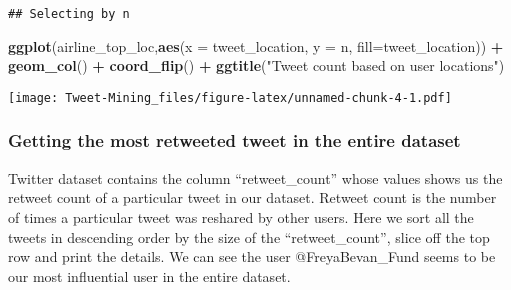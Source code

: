 \documentclass[
]{article}
\newenvironment{Shaded}{\begin{snugshade}}{\end{snugshade}}
\newcommand{\CommentTok}[1]{\textcolor[rgb]{0.56,0.35,0.01}{\textit{#1}}}
\newcommand{\DataTypeTok}[1]{\textcolor[rgb]{0.13,0.29,0.53}{#1}}
\newcommand{\DecValTok}[1]{\textcolor[rgb]{0.00,0.00,0.81}{#1}}
\newcommand{\KeywordTok}[1]{\textcolor[rgb]{0.13,0.29,0.53}{\textbf{#1}}}
\newcommand{\NormalTok}[1]{#1}
\newcommand{\OperatorTok}[1]{\textcolor[rgb]{0.81,0.36,0.00}{\textbf{#1}}}
\newcommand{\StringTok}[1]{\textcolor[rgb]{0.31,0.60,0.02}{#1}}
\begin{document}
\begin{verbatim}
## Selecting by n
\end{verbatim}

\begin{Shaded}
\begin{Highlighting}[]
\KeywordTok{ggplot}\NormalTok{(airline_top_loc,}\KeywordTok{aes}\NormalTok{(}\DataTypeTok{x =}\NormalTok{ tweet_location, }\DataTypeTok{y =}\NormalTok{ n, }\DataTypeTok{fill=}\NormalTok{tweet_location)) }\OperatorTok{+}\StringTok{ }\KeywordTok{geom_col}\NormalTok{() }\OperatorTok{+}\StringTok{ }\KeywordTok{coord_flip}\NormalTok{() }\OperatorTok{+}\StringTok{ }\KeywordTok{ggtitle}\NormalTok{(}\StringTok{"Tweet count based on user locations"}\NormalTok{)}
\end{Highlighting}
\end{Shaded}

\texttt{[image: Tweet-Mining\_files/figure-latex/unnamed-chunk-4-1.pdf]}

\hypertarget{getting-the-most-retweeted-tweet-in-the-entire-dataset}{%
\subsubsection{Getting the most retweeted tweet in the entire
dataset}\label{getting-the-most-retweeted-tweet-in-the-entire-dataset}}

Twitter dataset contains the column ``retweet\_count'' whose values
shows us the retweet count of a particular tweet in our dataset. Retweet
count is the number of times a particular tweet was reshared by other
users. Here we sort all the tweets in descending order by the size of
the ``retweet\_count'', slice off the top row and print the details. We
can see the user @FreyaBevan\_Fund seems to be our most influential user
in the entire dataset.

\begin{Shaded}
\end{Shaded}
\end{document}
